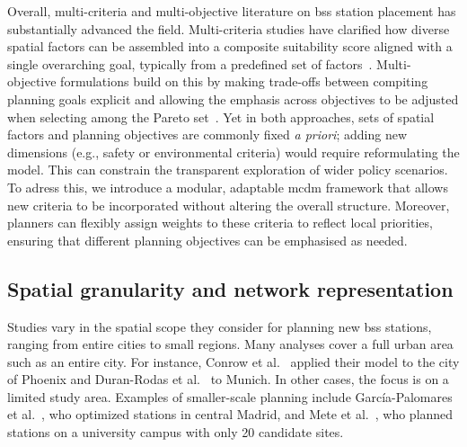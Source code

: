 Overall, multi-criteria and multi-objective literature on \ac{bss} station placement has substantially advanced the field. Multi-criteria studies have clarified how diverse spatial factors can be assembled into a composite suitability score aligned with a single overarching goal, typically from a predefined set of factors~\cite{Kabak2018, Guler2021a, Guler2021b, Bahadori2022}. Multi-objective formulations build on this by making trade-offs between compiting planning goals explicit and allowing the emphasis across objectives to be adjusted when selecting among the Pareto set~\cite{Duran-Rodas2021, Caggiani2020, Fan2024, Qian2022, Nikiforiadis2021}. Yet in both approaches, sets of spatial factors and planning objectives are commonly fixed \textit{a priori}; adding new dimensions (e.g., safety or environmental criteria) would require reformulating the model. This can constrain the transparent exploration of wider policy scenarios. To adress this, we introduce a modular, adaptable \ac{mcdm} framework that allows new criteria to be incorporated without altering the overall structure. Moreover, planners can flexibly assign weights to these criteria to reflect local priorities, ensuring that different planning objectives can be emphasised as needed.


\subsection{Spatial granularity and network representation}

Studies vary in the spatial scope they consider for planning new \ac{bss} stations, ranging from entire cities to small regions. Many analyses cover a full urban area such as an entire city. For instance, Conrow et al.~\cite{Conrow2018} applied their model to the city of Phoenix and Duran-Rodas et al.~\cite{Duran-Rodas2021} to Munich. In other cases, the focus is on a limited study area. Examples of smaller-scale planning include García-Palomares et al.~\cite{GarciaPalomares2012}, who optimized stations in central Madrid, and Mete et al.~\cite{Mete2018}, who planned stations on a university campus with only 20 candidate sites. 

